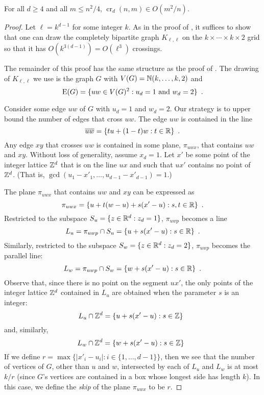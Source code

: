 \documentclass{patmorin}
\DeclareMathOperator{\crs}{cr}
\begin{document}
\begin{thm}
  For all $d\ge 4$ and all $m\le n^2/4$, $\crs_d(n,m)\in O(m^2/n)$.
\end{thm}

\begin{proof}
  Let $\ell=k^{d-1}$ for some integer $k$.  As in the proof of
  , it suffices to show that one can draw the
  completely bipartite graph $K_{\ell,\ell}$ on the $k\times\cdots\times
  k\times 2$ grid so that it has $O(k^{3(d-1)})=O(\ell^3)$ crossings.

  The remainder of this proof has the same structure as the proof of
  .  The drawing of $K_{\ell,\ell}$ we use is the graph
  $G$ with $V(G)=\mathbb{N}(k,\ldots,k,2)$ and
  \[
    \mathrm{E}(G) = \{ uw\in V(G)^2 :\mbox{$u_d = 1$ and $w_d = 2$} \} \enspace .
  \]
  
  Consider some edge $uw$ of $G$ with $u_d=1$ and $w_d=2$.  Our strategy
  is to upper bound the number of edges that cross $uw$.  The edge $uw$
  is contained in the line
  \[  
    \overline{uw} = \{ tu + (1-t)w : t\in \mathbb{R} \} \enspace . 
  \]
  Any edge $xy$ that crosses $uw$ is contained in some plane, $\pi_{uwx}$,
  that contains $uw$ and $xy$.  Without loss of generality, assume
  $x_d=1$.  Let $x'$ be some point of the integer lattice $\mathbb{Z}^d$ that is
  on the line $ux$ and such that $ux'$ contains no point of $\mathbb{Z}^d$. (That
  is, $\gcd(u_1-x'_1,\ldots,u_{d-1}-x'_{d-1}) = 1$.)
  
  The plane $\pi_{uwx}$ that contains $uw$ and $xy$ can be expressed as
  \[
     \pi_{uwx} = \{ u + t(w-u) + s(x'-u) : s,t\in\mathbb{R}\} \enspace .
  \]
  Restricted to the subspace $S_u=\{z\in\mathbb{R}^d: z_d=1\}$, $\pi_{uwp}$
  becomes a line
  \[
     L_u = \pi_{uwp}\cap S_u = \{ u + s(x'-u) : s\in\mathbb{R}\} \enspace .
  \]
  Similarly, restricted to the subspace $S_w=\{z\in\mathbb{R}^d: z_d=2\}$,
  $\pi_{uwp}$ becomes the parallel line:
  \[
     L_w = \pi_{uwp}\cap S_w = \{ w + s(x'-u) : s\in\mathbb{R}\} \enspace .
  \]
  Observe that, since there is no point on the segment $ux'$, the only
  points of the integer lattice $\mathbb{Z}^d$ contained in $L_u$ are obtained
  when the parameter $s$ is an integer:
  \[
     L_u\cap\mathbb{Z}^d = \{ u + s(x'-u) : s\in\mathbb{Z}\} \enspace 
  \]
  and, similarly,
  \[
     L_w\cap\mathbb{Z}^d = \{ w + s(x'-u) : s\in\mathbb{Z}\} \enspace 
  \]
  If we define $r=\max\{|x'_i-u_i| : i\in\{1,\ldots,d-1\}\}$, then we see
  that the number of vertices of $G$, other than $u$ and $w$, intersected
  by each of $L_u$ and $L_w$ is at most $k/r$ (since $G$'s vertices are
  contained in a box whose longest side has length $k$).  In this case,
  we define the \emph{skip} of the plane $\pi_{uwx}$ to be $r$.
  

\end{proof}
\end{document}
